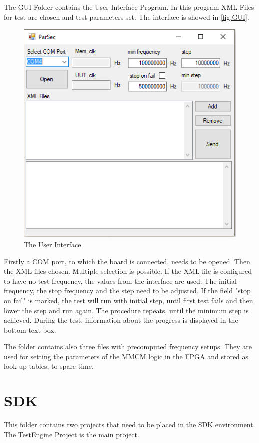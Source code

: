 The GUI Folder contains the User Interface Program. In this program  XML Files for test are chosen and test parameters set. The interface is showed in \autoref{fig:GUI}. 

\begin{figure}[h]
\centering
\includegraphics[width=.5\textwidth]{figures/GUI.PNG}
\caption{The User Interface}
\label{fig:GUI}
\end{figure}

Firstly a COM port, to which the board is connected, needs to be opened. Then the XML files chosen. Multiple selection is possible. If the XML file is configured to have no test frequency, the values from the interface are used. The initial frequency, the stop frequency and the step need to be adjusted. If the field "stop on fail" is marked, the test will run with initial step, until first test fails and then lower the step and run again. The procedure repeats, until the minimum step is achieved. During the test, information about the progress is displayed in the bottom text box.

The folder contains also three files with precomputed frequency setups. They are used for setting the parameters of the MMCM logic in the FPGA and stored as look-up tables, to spare time.

\section{SDK}
This folder contains two projects that need to be placed in the SDK environment. The TestEngine Project is the main project. 

